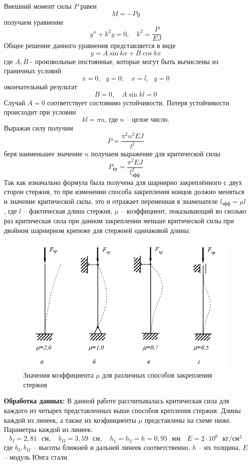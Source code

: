 \documentclass[a4paper,12pt]{article}
\begin{document}
Внешний момент силы $P$ равен 
\[M = -Py\]
получаем уравнение 
\[y'' + k^2 y = 0, \quad k^2 = \frac{P}{EJ}\]
Общее решение данного уравнения представляется в виде
\[ y = A\sin kx + B\cos kx\]
где $A, B$ - произвольные постоянные, которые могут быть вычислены из граничных условий
\[x = 0, \text{ } y = 0; \quad x = l, \text{ } y = 0\]
окончательный результат 
\[B = 0, \quad A\sin kl = 0\]
Случай $A = 0$ соответствует состоянию устойчивости. Потеря устойчивости происходит при условии 
\[kl = \pi n\text{, где $n$ -- целое число.}\] 
Выражая силу получим 
\[P = \frac{\pi^2 n^2 E J}{l^2}\]
беря наименьшее значение $n$ получаем выражение для критической силы
\[P_{кр} = \frac{\pi^2 E J}{l_{эфф}^2}\]
Так как изначально формула была получена для шарнирно закреплённого с двух сторон стержня, то при изменении способа закрепления концов должно меняться и значение критической силы, это и отражает переменная в знаменателе $l_{эфф} = \mu l$, где $l$ -- фактическая длина стержня, $\mu$ -- коэффициент, показывающий во сколько раз критическая сила при данном закреплении меньше критической силы при двойном шарнирном крепеже для стержней одинаковой длины. 
\newpage

\begin{figure}[H]\label{fig: sterjni}
    \centering
    \includegraphics[width = \textwidth]{Sterjni.png}
    \caption{Значения коэффициента $\mu$ для различных способов закрепления стержня}
\end{figure}

\textbf{Обработка данных:} В данной работе рассчитывалась критическая сила для каждого из четырех представленных выше способов крепления стержня. Длины каждой из линеек, а также их коэфиициенты $\mu$ представлены на схеме ниже. Параметры каждой из линеек:
\[b_I = 2,81 \text{ $см$}, \quad b_{II} = 3,59 \text{ $см$}, \quad h_1 = h_2 = h = 0,95 \text{ $мм$} \quad E = 2 \cdot 10^{6} \text{ $кг / см^2$}\]
где $b_I, b_{II}$ -- высоты ближней и дальней линеек соответственно, $h$ -- их толщина, $E$ -- модуль Юнга стали.
\end{document}

